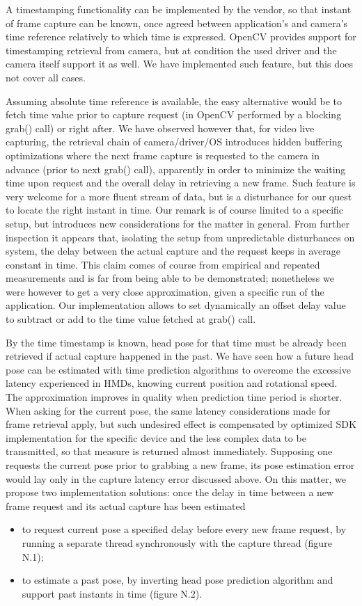 A timestamping functionality can be implemented by the vendor, so that instant of frame capture can be known, once agreed between application's and camera's time reference relatively to which time is expressed. OpenCV provides support for timestamping retrieval from camera, but at condition the used driver and the camera itself support it as well. We have implemented such feature, but this does not cover all cases.

Assuming absolute time reference is available, the easy alternative would be to fetch time value prior to capture request (in OpenCV performed by a blocking grab() call) or right after. We have observed however that, for video live capturing, the retrieval chain of camera/driver/OS introduces hidden buffering optimizations where the next frame capture is requested to the camera in advance (prior to next grab() call), apparently in order to minimize the waiting time upon request and the overall delay in retrieving a new frame. Such feature is very welcome for a more fluent stream of data, but is a disturbance for our quest to locate the right instant in time. Our remark is of course limited to a specific setup, but introduces new considerations for the matter in general. From further inspection it appears that, isolating the setup from unpredictable disturbances on system, the delay between the actual capture and the request keeps in average constant in time. This claim comes of course from empirical and repeated measurements and is far from being able to be demonstrated; nonetheless we were however to get a very close approximation, given a specific run of the application. Our implementation allows to set dynamically an offset delay value to subtract or add to the time value fetched at grab() call.

By the time timestamp is known, head pose for that time must be already been retrieved if actual capture happened in the past. We have seen how a future head pose can be estimated with time prediction algorithms to overcome the excessive latency experienced in HMDs, knowing current position and rotational speed. The approximation improves in quality when prediction time period is shorter. When asking for the current pose, the same latency considerations made for frame retrieval apply, but such undesired effect is compensated by optimized SDK implementation for the specific device and the less complex data to be transmitted, so that measure is returned almost immediately. Supposing one requests the current pose prior to grabbing a new frame, its pose estimation error would lay only in the capture latency error discussed above. On this matter, we propose two implementation solutions: once the delay in time between a new frame request and its actual capture has been estimated
\begin{itemize}
\item to request current pose a specified delay before every new frame request, by running a separate thread synchronously with the capture thread (figure N.1);
\item to estimate a past pose, by inverting head pose prediction algorithm and support past instants in time (figure N.2).
\end{itemize}

